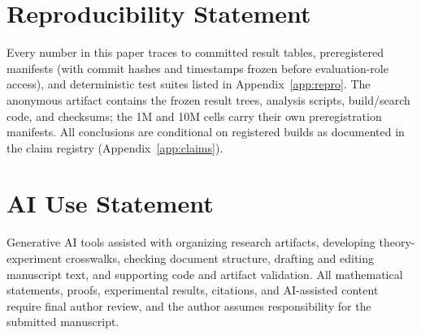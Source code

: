 \documentclass{article}
\begin{document}
\section*{Reproducibility Statement}
Every number in this paper traces to committed result tables, preregistered manifests (with commit
hashes and timestamps frozen before evaluation-role access), and deterministic test suites listed in
Appendix~\ref{app:repro}. The anonymous artifact contains the frozen result trees, analysis scripts,
build/search code, and checksums; the 1M and 10M cells carry their own preregistration manifests. All
conclusions are conditional on registered builds as documented in the claim registry
(Appendix~\ref{app:claims}).

\section*{AI Use Statement}
Generative AI tools assisted with organizing research artifacts, developing theory-experiment
crosswalks, checking document structure, drafting and editing manuscript text, and supporting code and
artifact validation. All mathematical statements, proofs, experimental results, citations, and
AI-assisted content require final author review, and the author assumes responsibility for the submitted
manuscript.
\end{document}
